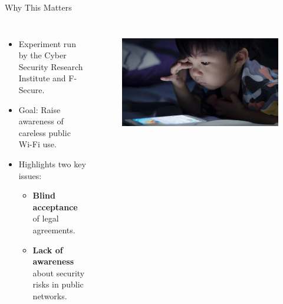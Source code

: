 \begin{frame}{Why This Matters}
\begin{columns}[c]
  \begin{itemize}
    \item Experiment run by the Cyber Security Research Institute and F-Secure.
    \item Goal: Raise awareness of careless public Wi-Fi use.
    \item Highlights two key issues:
    \begin{itemize}
        \item \textbf{Blind acceptance} of legal agreements.
        \item \textbf{Lack of awareness} about security risks in public networks\cite{CHILD}.
    \end{itemize}
\end{itemize}

    \centering
    \begin{figure}
        \centering
        \includegraphics[width=\textwidth]{images/child.png}
        \label{fig:child}
    \end{figure}    
\end{columns}
\end{frame}
